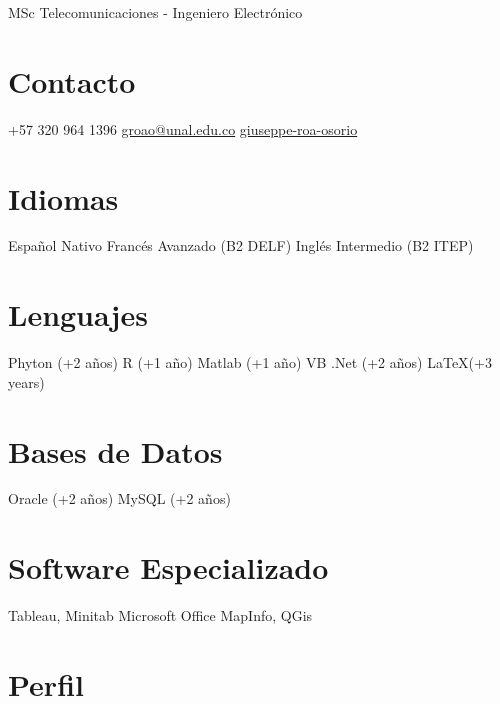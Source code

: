 \documentclass[11pt]{friggeri-cv} %
\begin{document}
 {MSc Telecomunicaciones - Ingeniero Electrónico}
\begin{aside}
\section{Contacto}
{\color{black}{\faHome}} \color{headercolor}{Cll 146f $\#$73a-20 
Int 13 Apto 502
Bogota, Colombia}
{\color{green2}{\faWhatsapp}}  +57 320 964 1396
{\color{yellow}{\faEnvelope}}  \href{mailto:groao@unal.edu.co}{groao@unal.edu.co}
{\color{linkedin}{\faLinkedin}}  \href{https://www.linkedin.com/in/giuseppe-roa-osorio-lssbb-25341487}{giuseppe-roa-osorio}
~
\section{Idiomas}
Español Nativo
Francés Avanzado
(B2 DELF)
Inglés Intermedio
(B2 ITEP)
~
\section{Lenguajes {\color{php}\faCode} }
Phyton (+2 años)
R (+1 año)
Matlab (+1 año)
VB .Net (+2 años)
\LaTeX (+3 years)
~
\section{Bases de Datos {\color{gray}\faDatabase} }
Oracle (+2 años)
MySQL (+2 años)
~
\section{Software Especializado}
{\color{php}\faSuperscript} Tableau, Minitab 
{\color{black}\faWindows} Microsoft Office
{\color{black}\faWrench} MapInfo, QGis
\end{aside}
\section{Perfil}
\end{document}
